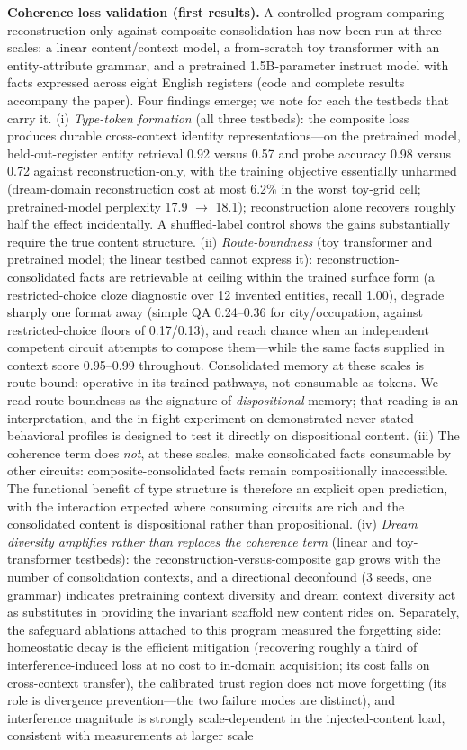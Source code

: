 \documentclass[11pt]{article}
\begin{document}
\textbf{Coherence loss validation (first results).} A controlled program comparing reconstruction-only against composite consolidation has now been run at three scales: a linear content/context model, a from-scratch toy transformer with an entity-attribute grammar, and a pretrained 1.5B-parameter instruct model with facts expressed across eight English registers (code and complete results accompany the paper). Four findings emerge; we note for each the testbeds that carry it. (i) \emph{Type-token formation} (all three testbeds): the composite loss produces durable cross-context identity representations---on the pretrained model, held-out-register entity retrieval 0.92 versus 0.57 and probe accuracy 0.98 versus 0.72 against reconstruction-only, with the training objective essentially unharmed (dream-domain reconstruction cost at most 6.2\% in the worst toy-grid cell; pretrained-model perplexity 17.9 $\to$ 18.1); reconstruction alone recovers roughly half the effect incidentally. A shuffled-label control shows the gains substantially require the true content structure. (ii) \emph{Route-boundness} (toy transformer and pretrained model; the linear testbed cannot express it): reconstruction-consolidated facts are retrievable at ceiling within the trained surface form (a restricted-choice cloze diagnostic over 12 invented entities, recall 1.00), degrade sharply one format away (simple QA 0.24--0.36 for city/occupation, against restricted-choice floors of 0.17/0.13), and reach chance when an independent competent circuit attempts to compose them---while the same facts supplied in context score 0.95--0.99 throughout. Consolidated memory at these scales is route-bound: operative in its trained pathways, not consumable as tokens. We read route-boundness as the signature of \emph{dispositional} memory; that reading is an interpretation, and the in-flight experiment on demonstrated-never-stated behavioral profiles is designed to test it directly on dispositional content. (iii) The coherence term does \emph{not}, at these scales, make consolidated facts consumable by other circuits: composite-consolidated facts remain compositionally inaccessible. The functional benefit of type structure is therefore an explicit open prediction, with the interaction expected where consuming circuits are rich and the consolidated content is dispositional rather than propositional. (iv) \emph{Dream diversity amplifies rather than replaces the coherence term} (linear and toy-transformer testbeds): the reconstruction-versus-composite gap grows with the number of consolidation contexts, and a directional deconfound (3 seeds, one grammar) indicates pretraining context diversity and dream context diversity act as substitutes in providing the invariant scaffold new content rides on. Separately, the safeguard ablations attached to this program measured the forgetting side: homeostatic decay is the efficient mitigation (recovering roughly a third of interference-induced loss at no cost to in-domain acquisition; its cost falls on cross-context transfer), the calibrated trust region does not move forgetting (its role is divergence prevention---the two failure modes are distinct), and interference magnitude is strongly scale-dependent in the injected-content load, consistent with measurements at larger scale 
\end{document}
